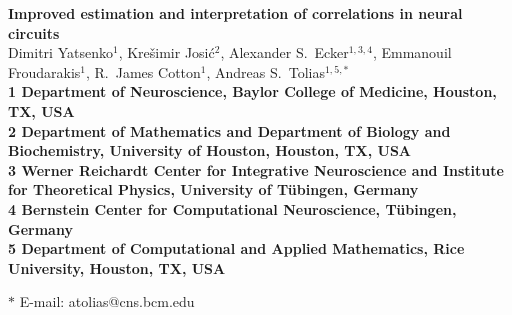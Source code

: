 \begin{flushleft}
{\Large
\textbf{Improved estimation and interpretation of correlations in neural circuits}
}
\\
Dimitri Yatsenko$^{1}$,
Kre\v{s}imir Josi\'{c}$^{2}$,
Alexander S.~Ecker$^{1,3,4}$,
Emmanouil Froudarakis$^{1}$,
R.~James Cotton$^{1}$,
Andreas S.~Tolias$^{1,5,\ast}$
\\
\bf{1} Department of Neuroscience, Baylor College of Medicine, Houston, TX, USA
\\
\bf{2} Department of Mathematics and Department of Biology and Biochemistry, University of Houston, Houston, TX, USA
\\
\bf{3}  Werner Reichardt Center for Integrative Neuroscience and Institute for Theoretical Physics, University of T\"ubingen, Germany
\\
\bf{4} Bernstein Center for Computational Neuroscience, T\"ubingen, Germany
\\
\bf{5} Department of Computational and Applied Mathematics, Rice University, Houston, TX, USA

$\ast$ E-mail: atolias@cns.bcm.edu
\end{flushleft}

